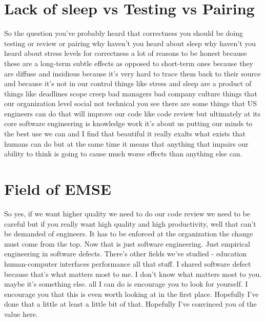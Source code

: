 \documentclass[14pt]{extreport}
\begin{document}
\chapter{Lack of sleep vs Testing vs Pairing}
So the question you've probably heard that correctness you should be doing testing or review or pairing why haven't you heard about sleep why haven't you heard about stress levels for correctness a lot of reasons to be honest because these are a long-term subtle effects as opposed to short-term ones because they are diffuse and insidious because it's very hard to trace them back to their source and because it's not in our control things like stress and sleep are a product of things like deadlines scope creep bad managers bad company culture things that our organization level social not technical you see there are some things that US engineers can do that will improve our code like code review but ultimately at its core software engineering is knowledge work it's about us putting our minds to the best use we can and I find that beautiful it really exalts what exists that humans can do but at the same time it means that anything that impairs our ability to think is going to cause much worse effects than anything else can.

\chapter{Field of EMSE}
So yes, if we want higher quality we need to do our code review we need to be careful but if you really want high quality and high productivity, well that can't be demanded of engineers.
It has to be enforced at the organization the change must come from the top. Now that is just software engineering.
Just empirical engineering in software defects.
There's other fields we've studied - education human-computer interfaces performance all that stuff. 
I shared software defect because that's
what matters most to me.
I don't know what matters most to you. 
maybe it's something else.
all I can do is encourage you to look for yourself.
I encourage you that this is even worth looking at in the first place.
Hopefully I've done that a little at least a little bit of that.
Hopefully I've convinced you of the value here. 
\end{document}

